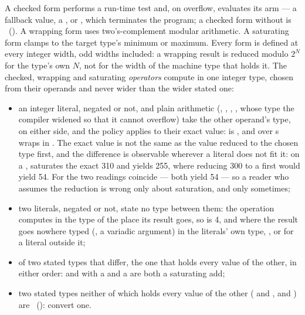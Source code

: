 \pnum
A checked form performs a run-time test and, on overflow, evaluates its  arm ---
a fallback value, a , or , which terminates the program; a
checked form without  is \illformed{}~().  A wrapping form uses
two's-complement modular arithmetic.  A saturating form clamps to the target type's minimum or
maximum.  Every form is defined at every integer width, odd widths included: a wrapping result
is reduced modulo \(2^N\) for the type's own \(N\), not for the width of the machine type that
holds it.
The checked, wrapping and saturating \emph{operators} compute in one integer type, chosen from
their operands and never wider than the wider stated one:
\begin{itemize}
  \item an integer literal, negated or not, and plain arithmetic (\lain{+}, \lain{-}, \lain{*},
        \lain{/}, whose type the compiler widened so that it cannot overflow) take the other
        operand's type, on either side, and the policy applies to their exact value:
         is , and  over s wraps in
        .  The exact value is not the same as the value reduced to the chosen type
        first, and the difference is observable wherever a literal does not fit it: on a
        ,  saturates the exact 310 and yields 255, where reducing 300 to
        a  first would yield 54.  For \lain{+\%} the two readings coincide --- both
        yield 54 --- so a reader who assumes the reduction is wrong only about saturation, and
        only sometimes;
  \item two literals, negated or not, state no type between them: the operation computes in
        the type of the place its result goes, so  is 4, and where the
        result goes nowhere typed (, a variadic argument) in the
        literals' own type, , or  for a literal outside it;
  \item of two stated types that differ, the one that holds every value of the other, in either
        order:  and  with a  and a  are both a
         saturating add;
  \item two stated types neither of which holds every value of the other ( and
        ,  and ) are \illformed{}~(): convert one.
\end{itemize}

